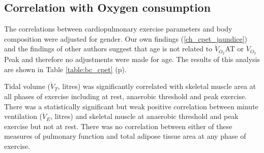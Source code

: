 
\subsection{Correlation with Oxygen consumption}

The correlations between cardiopulmonary exercise parameters and body composition were adjusted for gender. Our own findings (\ref{ch_cpet_jaundice}) and the findings of other authors suggest that age is not related to $\dot{V}_{O_2}$AT or $\dot{V}_{O_2}$Peak and therefore no adjustments were made for age. The results of this analysis are shown in Table \ref{table:bc_cpet} (p\pageref{table:bc_cpet}).


Tidal volume ($\dot{V}_T$, litres) was significantly correlated with skeletal muscle area at all phases of exercise including at rest, anaerobic threshold and peak exercise. There was a statistically significant but weak positive correlation between minute ventilation ($\dot{V}_E$, litres) and skeletal muscle at anaerobic threshold and peak exercise but not at rest. There was no correlation between either of these measures of pulmonary function and total adipose tissue area at any phase of exercise.

